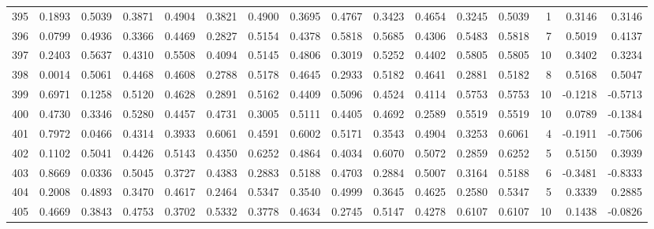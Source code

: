 \begin{tabular}{lrrrrrrrrrrrrrrr}
395 &      0.1893 &  0.5039 &  0.3871 &  0.4904 &  0.3821 &  0.4900 &  0.3695 &  0.4767 &  0.3423 &  0.4654 &   0.3245 &     0.5039 &      1 &                    0.3146 &                     0.3146 \\
396 &      0.0799 &  0.4936 &  0.3366 &  0.4469 &  0.2827 &  0.5154 &  0.4378 &  0.5818 &  0.5685 &  0.4306 &   0.5483 &     0.5818 &      7 &                    0.5019 &                     0.4137 \\
397 &      0.2403 &  0.5637 &  0.4310 &  0.5508 &  0.4094 &  0.5145 &  0.4806 &  0.3019 &  0.5252 &  0.4402 &   0.5805 &     0.5805 &     10 &                    0.3402 &                     0.3234 \\
398 &      0.0014 &  0.5061 &  0.4468 &  0.4608 &  0.2788 &  0.5178 &  0.4645 &  0.2933 &  0.5182 &  0.4641 &   0.2881 &     0.5182 &      8 &                    0.5168 &                     0.5047 \\
399 &      0.6971 &  0.1258 &  0.5120 &  0.4628 &  0.2891 &  0.5162 &  0.4409 &  0.5096 &  0.4524 &  0.4114 &   0.5753 &     0.5753 &     10 &                   -0.1218 &                    -0.5713 \\
400 &      0.4730 &  0.3346 &  0.5280 &  0.4457 &  0.4731 &  0.3005 &  0.5111 &  0.4405 &  0.4692 &  0.2589 &   0.5519 &     0.5519 &     10 &                    0.0789 &                    -0.1384 \\
401 &      0.7972 &  0.0466 &  0.4314 &  0.3933 &  0.6061 &  0.4591 &  0.6002 &  0.5171 &  0.3543 &  0.4904 &   0.3253 &     0.6061 &      4 &                   -0.1911 &                    -0.7506 \\
402 &      0.1102 &  0.5041 &  0.4426 &  0.5143 &  0.4350 &  0.6252 &  0.4864 &  0.4034 &  0.6070 &  0.5072 &   0.2859 &     0.6252 &      5 &                    0.5150 &                     0.3939 \\
403 &      0.8669 &  0.0336 &  0.5045 &  0.3727 &  0.4383 &  0.2883 &  0.5188 &  0.4703 &  0.2884 &  0.5007 &   0.3164 &     0.5188 &      6 &                   -0.3481 &                    -0.8333 \\
404 &      0.2008 &  0.4893 &  0.3470 &  0.4617 &  0.2464 &  0.5347 &  0.3540 &  0.4999 &  0.3645 &  0.4625 &   0.2580 &     0.5347 &      5 &                    0.3339 &                     0.2885 \\
405 &      0.4669 &  0.3843 &  0.4753 &  0.3702 &  0.5332 &  0.3778 &  0.4634 &  0.2745 &  0.5147 &  0.4278 &   0.6107 &     0.6107 &     10 &                    0.1438 &                    -0.0826 \\

\end{tabular}
